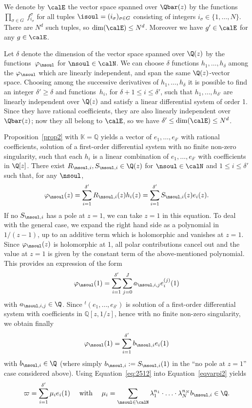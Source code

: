 We denote by $\calE$ the vector space spanned over $\Qbar(z)$ by the functions
$\prod_{\sigma\in G} \ f_{i_{ \sigma}}^{ \sigma} $ for all tuples $\isoul = (i_\sigma)_{\sigma\in G}$ consisting of integers $i_\sigma\in\{1,\ldots,N\}$. There are $N^d$ such tuples, so $\dim(\calE)\leq N^d$. Moreover we have $g'\in\calE $ for any $g\in\calE$.

Let $\delta$ denote the dimension of the vector space spanned over $\Q(z)$ by the functions~$\varphi_{\nsoul}$ for $\nsoul\in\calN$. We can choose $\delta$ functions $h_1, \ldots, h_\delta$ among the $\varphi_{\nsoul}$ which are linearly independent, and span the same $\Q(z)$-vector space. Choosing among the successive derivatives of $h_1, \ldots, h_\delta$ it is possible to find an integer $\delta'\geq \delta$ and functions~$h_i$, for $\delta+1\leq i \leq \delta'$, such that $h_1, \ldots, h_{\delta'}$ are linearly independent over $\Q(z)$ and satisfy a linear differential system of order 1. Since they have rational coefficients, they are also linearly independent over $\Qbar(z)$; now they all belong to $\calE$, so we have $\delta'\leq \dim(\calE)\leq N^d$.

Proposition~\ref{prop2} with $\mathbb K=\mathbb Q$ yields a vector of \Efunctions $e_1,\ldots,e_{\delta'}$ with rational coefficients, solution of a first-order differential system with no finite non-zero singularity, such that each $h_i$ is a linear combination of $e_1,\ldots,e_{\delta'}$ with coefficients in $\Q[z]$. There exist $R_{\nsoul,i}, S_{\nsoul,i}\in\Q(z)$ for $\nsoul\in\calN$ and $1\leq i \leq \delta'$ such that, for any $\nsoul$,
\[
\varphi_{\nsoul}(z) = \sum_{i=1}^{\delta'} R_{\nsoul,i}(z) h_i(z) = \sum_{i=1}^{\delta'} S_{\nsoul,i}(z) e_i(z).
\]
If no $ S_{\nsoul,i}$ has a pole at $z=1$, we can take $z=1$ in this equation. To deal with the general case, we expand the right hand side as a polynomial in $1/(z-1)$, up to an additive term which is holomorphic and vanishes at $z=1$. Since $ \varphi_{\nsoul}(z)$ is holomorphic at 1, all polar contributions cancel out and the value at $z=1$ is given by the constant term of the above-mentioned polynomial. This provides an expression of the form
\[
\varphi_{\nsoul}(1) = \sum_{i=1}^{\delta'} \sum_{j=0}^{J} a_{\nsoul,i,j} e_i^{(j)}(1)
\]
with $a_{\nsoul,i,j}\in \Q$. Since ${}^t(e_1,\ldots,e_{\delta'})$ is solution of a first-order differential system with coefficients in $\mathbb Q[z,1/z]$, hence with no finite non-zero singularity, we obtain finally
\begin{equation}\label{eq:2512}
\varphi_{\nsoul}(1) = \sum_{i=1}^{\delta'} b_{\nsoul,i} e_i (1)
\end{equation}
with $b_{\nsoul,i}\in \Q$ (where simply $b_{\nsoul,i}:=S_{\nsoul,i}(1)$ in the ``no pole at $z=1$'' case considered above).
Using Equation~\eqref{eq:2512} into Equation~\eqref{eqvarpi2} yields
\[
\varpi = \sum_{i=1}^{\delta'} \mu_i e_i(1)
\quad \mbox{ with }\quad
\mu_i = \sum_{\nsoul \in \calN} \lambda_1^{n_1} \cdot \ldots \cdot \lambda_N^{n_N} b_{\nsoul,i}\in\Q.
\]

